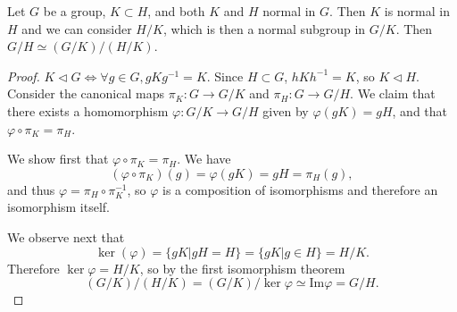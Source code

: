 \begin{theorem}
Let $G$ be a group, $K \subset H$, and both $K$ and $H$ normal in
$G$. Then $K$ is normal in $H$ and we can consider $H / K$, which is
then a normal subgroup in $G / K$. Then $G / H \simeq (G / K) / (H / K)$.
\end{theorem}
\begin{proof}
$K \triangleleft G \iff \forall g \in G, g K g^{-1} = K$. Since
$H \subset G$, $h K h^{-1} = K$, so $K \triangleleft H$. Consider the
canonical maps $\pi_K : G \to G / K$ and
$\pi_H : G \to G / H$. We claim that there exists a homomorphism
$\varphi : G / K \to G / H$ given by $\varphi(gK) = gH$, and that
$\varphi \circ \pi_K = \pi_H$.

We show first that $\varphi \circ \pi_K = \pi_H$. We have
$$
(\varphi \circ \pi_K)(g) = \varphi(gK) = gH = \pi_H(g),
$$
and thus $\varphi = \pi_H \circ \pi_K^{-1}$, so $\varphi$ is a
composition of isomorphisms and therefore an isomorphism itself.

We observe next that
$$
\ker(\varphi)
  = \{ gK | gH = H \}
  = \{ gK | g \in H \}
  = H / K.
$$
Therefore
$\ker \varphi = H / K$, so by the first isomorphism theorem
$$
       (G / K) / (H / K)
=      (G / K) / \ker \varphi
\simeq \mathrm{Im} \varphi
=      G / H.
$$
\end{proof}

